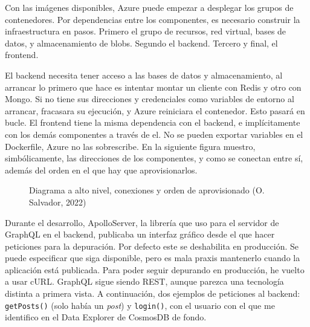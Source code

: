 \documentclass[11pt]{article}
\begin{document}
\begin{flushleft}
	Con las imágenes disponibles, Azure puede empezar a desplegar los grupos de contenedores. Por dependencias entre los componentes, es necesario construir la infraestructura en pasos. Primero el grupo de recursos, red virtual, bases de datos, y almacenamiento de blobs. Segundo el backend. Tercero y final, el frontend.
	\linebreak
	
	El backend necesita tener acceso a las bases de datos y almacenamiento, al arrancar lo primero que hace es intentar montar un cliente con Redis y otro con Mongo. Si no tiene sus direcciones y credenciales como variables de entorno al arrancar, fracasara su ejecución, y Azure reiniciara el contenedor. Esto pasará en bucle. El frontend tiene la misma dependencia con el backend, e implícitamente con los demás componentes a través de el. No se pueden exportar variables en el Dockerfile, Azure no las sobrescribe. En la siguiente figura muestro, simbólicamente, las direcciones de los componentes, y como se conectan entre sí, además del orden en el que hay que aprovisionarlos.
	\linebreak	
				
		\begin{figure}[htb]
			\centering
			\caption{Diagrama a alto nivel, conexiones y orden de aprovisionado (O. Salvador, 2022)}
		\end{figure}		
		
	Durante el desarrollo, ApolloServer, la librería que uso para el servidor de GraphQL en el backend, publicaba un interfaz gráfico desde el que hacer peticiones para la depuración. Por defecto este se deshabilita en producción. Se puede especificar que siga disponible, pero es mala praxis mantenerlo cuando la aplicación está publicada. Para poder seguir depurando en producción, he vuelto a usar cURL. GraphQL sigue siendo REST, aunque parezca una tecnología distinta a primera vista. A continuación, dos ejemplos de peticiones al backend: \texttt{getPosts()} (solo había un \textit{post}) y \texttt{login()}, con el usuario con el que me identifico en el Data Explorer de CosmosDB de fondo.
	\linebreak
	

\end{flushleft}
\end{document}
